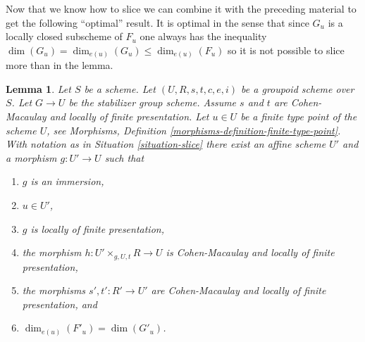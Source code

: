 \documentclass{stacks-project}
\theoremstyle{plain}
\newtheorem{lemma}[subsection]{Lemma}
\theoremstyle{definition}
\theoremstyle{remark}
\numberwithin{equation}{subsection}
\begin{document}
\noindent
Now that we know how to slice we can combine it with the preceding material
to get the following ``optimal'' result. It is optimal in the sense that
since $G_u$ is a locally closed subscheme of $F_u$ one always has the
inequality $\dim(G_u) = \dim_{e(u)}(G_u) \leq \dim_{e(u)}(F_u)$ so it
is not possible to slice more than in the lemma.

\begin{lemma}
\label{lemma-max-slice}
Let $S$ be a scheme.
Let $(U, R, s, t, c, e, i)$ be a groupoid scheme over $S$.
Let $G \to U$ be the stabilizer group scheme.
Assume $s$ and $t$ are Cohen-Macaulay and locally of finite presentation.
Let $u \in U$ be a finite type point of the scheme $U$, see
Morphisms, Definition \ref{morphisms-definition-finite-type-point}.
With notation as in
Situation \ref{situation-slice}
there exist an affine scheme $U'$ and a morphism $g : U' \to U$ such that
\begin{enumerate}
\item $g$ is an immersion,
\item $u \in U'$,
\item $g$ is locally of finite presentation,
\item the morphism $h : U' \times_{g, U, t} R \longrightarrow U$
is Cohen-Macaulay and locally of finite presentation,
\item the morphisms $s', t' : R' \to U'$ are Cohen-Macaulay and
locally of finite presentation, and
\item $\dim_{e(u)}(F'_u) = \dim(G'_u)$.
\end{enumerate}
\end{lemma}
\end{document}
